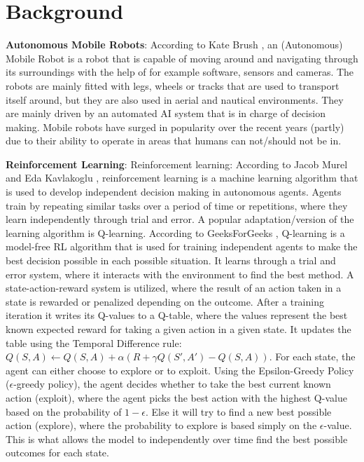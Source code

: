 \section{Background}

\textbf{Autonomous Mobile Robots}:
According to Kate Brush \cite{KateBrush1Robots}, an (Autonomous) Mobile
Robot is a robot that is capable of moving around and navigating through its
surroundings with the help of for example software, sensors and cameras. The robots
are mainly fitted with legs, wheels or tracks that are used to transport itself around, but
they are also used in aerial and nautical environments. They are mainly driven by an
automated AI system that is in charge of decision making. Mobile robots have surged in
popularity over the recent years (partly) due to their ability to operate in areas that
humans can not/should not be in.


\textbf{Reinforcement Learning}:
Reinforcement learning: According to Jacob Murel and Eda Kavlakoglu \cite{JacobMurel1RL}, reinforcement learning is a machine learning
algorithm that is used to develop independent decision making in autonomous agents.
Agents train by repeating similar tasks over a period of time or repetitions, where they
learn independently through trial and error. A popular adaptation/version of the learning
algorithm is Q-learning. According to GeeksForGeeks \cite{GeeksForGeeks1RL}, Q-learning is a model-free RL
algorithm that is used for training independent agents to make the best decision
possible in each possible situation. It learns through a trial and error system, where it
interacts with the environment to find the best method. A state-action-reward system is
utilized, where the result of an action taken in a state is rewarded or penalized
depending on the outcome. After a training iteration it writes its Q-values to a Q-table,
where the values represent the best known expected reward for taking a given action in
a given state. It updates the table using the Temporal Difference rule:
\(Q(S, A) \leftarrow Q(S, A) + \alpha \left( R + \gamma Q(S', A') - Q(S, A) \right)\). For each state, the agent can either choose to
explore or to exploit. Using the Epsilon-Greedy Policy (\(\epsilon\)-greedy policy), the agent
decides whether to take the best current known action (exploit), where the agent picks
the best action with the highest Q-value based on the probability of \(1-\epsilon\). Else it will try to
find a new best possible action (explore), where the probability to explore is based
simply on the \(\epsilon\)-value. This is what allows the model to independently over time find the
best possible outcomes for each state. 


